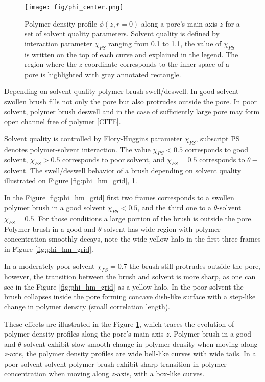 \documentclass[12pt, a4paper]{article}
\begin{document}
\begin{figure}
    \centering
    \texttt{[image: fig/phi\_center.png]}
    \caption{Polymer density profile $\phi(z, r=0)$ along a pore's main axis $z$ for a set of solvent quality parameters. 
    Solvent quality is defined by interaction parameter $\chi_{PS}$ ranging from 0.1 to 1.1, the value of $\chi_{PS}$ is written on the top of each curve and explained in the legend.
    The region where the $z$ coordinate corresponds to the inner space of a pore is highlighted with gray annotated rectangle. 
    }
    \label{fig:phi_center}
\end{figure}

Depending on solvent quality polymer brush swell/deswell. 
In good solvent swollen brush fills not only the pore but also protrudes outside the pore. In poor solvent, polymer brush deswell and in the case of sufficiently large pore may form open channel free of polymer [CITE].

Solvent quality is controlled by Flory-Huggins parameter $\chi_{PS}$, subscript PS denotes polymer-solvent interaction. The value $\chi_{PS}<0.5$ corresponds to good solvent, $\chi_{PS}>0.5$ corresponds to poor solvent, and $\chi_{PS}=0.5$ corresponds to $\theta-$solvent.
The swell/deswell behavior of a brush depending on solvent quality illustrated on Figure \ref{fig:phi_hm_grid}, \ref{fig:phi_center}.

In the Figure \ref{fig:phi_hm_grid} first two frames corresponds to a swollen polymer brush in a good solvent $\chi_{PS}<0.5$, and the third one to a $\theta$-solvent $\chi_{PS}=0.5$. 
For those conditions a large portion of the brush is outside the pore.
Polymer brush in a good and $\theta$-solvent has wide region with polymer concentration smoothly decays, note the wide yellow halo in the first three frames in Figure \ref{fig:phi_hm_grid}.

In a moderately poor solvent $\chi_{PS}=0.7$ the brush still protrudes outside the pore, however, the transition between the brush and solvent is more sharp, as one can see in the Figure \ref{fig:phi_hm_grid} as a yellow halo.
In the poor solvent the brush collapses inside the pore forming concave dish-like surface with a step-like change in polymer density (small correlation length).

These effects are illustrated in the Figure \ref{fig:phi_center}, which traces the evolution of polymer density profiles along the pore's main axis $z$. 
Polymer brush in a good and $\theta$-solvent exhibit slow smooth change in polymer density when moving along $z$-axis, the polymer density profiles are wide bell-like curves with wide tails.
In a poor solvent solvent polymer brush exhibit sharp transition in polymer concentration when moving along $z$-axis, with a box-like curves.
\end{document}
